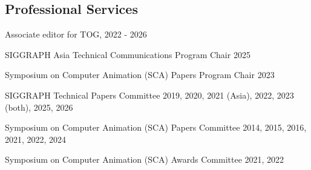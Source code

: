 \documentclass[margin,line]{res}
\newenvironment{list2}{
  \begin{list}{$\bullet$}{%
      \setlength{\itemsep}{0in}
      \setlength{\parsep}{0in} \setlength{\parskip}{0in}
      \setlength{\topsep}{0in} \setlength{\partopsep}{0in} 
      \setlength{\leftmargin}{0.2in}}}{\end{list}}
\begin{document}
\begin{resume}



\section{\sc Professional Services}
Associate editor for TOG, 2022 - 2026

\vspace*{-.15in}
SIGGRAPH Asia Technical Communications Program Chair 2025

\vspace*{-.15in}
Symposium on Computer Animation (SCA) Papers Program Chair 2023

\vspace*{-.15in}
SIGGRAPH Technical Papers Committee 2019, 2020, 2021 (Asia), 2022, 2023 (both), 2025, 2026

\vspace*{-.15in}
Symposium on Computer Animation (SCA) Papers Committee 2014, 2015, 2016, 2021, 2022, 2024

\vspace*{-.15in}
Symposium on Computer Animation (SCA) Awards Committee 2021, 2022


\end{resume}
\end{document}
